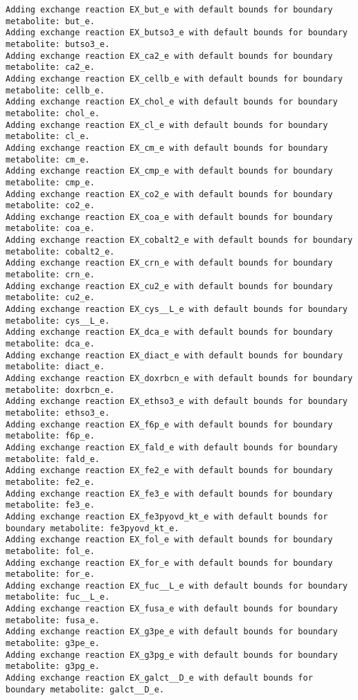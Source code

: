 \documentclass[
  letterpaper,
  DIV=11,
  numbers=noendperiod]{scrartcl}
\begin{document}
\begin{verbatim}
Adding exchange reaction EX_but_e with default bounds for boundary metabolite: but_e.
Adding exchange reaction EX_butso3_e with default bounds for boundary metabolite: butso3_e.
Adding exchange reaction EX_ca2_e with default bounds for boundary metabolite: ca2_e.
Adding exchange reaction EX_cellb_e with default bounds for boundary metabolite: cellb_e.
Adding exchange reaction EX_chol_e with default bounds for boundary metabolite: chol_e.
Adding exchange reaction EX_cl_e with default bounds for boundary metabolite: cl_e.
Adding exchange reaction EX_cm_e with default bounds for boundary metabolite: cm_e.
Adding exchange reaction EX_cmp_e with default bounds for boundary metabolite: cmp_e.
Adding exchange reaction EX_co2_e with default bounds for boundary metabolite: co2_e.
Adding exchange reaction EX_coa_e with default bounds for boundary metabolite: coa_e.
Adding exchange reaction EX_cobalt2_e with default bounds for boundary metabolite: cobalt2_e.
Adding exchange reaction EX_crn_e with default bounds for boundary metabolite: crn_e.
Adding exchange reaction EX_cu2_e with default bounds for boundary metabolite: cu2_e.
Adding exchange reaction EX_cys__L_e with default bounds for boundary metabolite: cys__L_e.
Adding exchange reaction EX_dca_e with default bounds for boundary metabolite: dca_e.
Adding exchange reaction EX_diact_e with default bounds for boundary metabolite: diact_e.
Adding exchange reaction EX_doxrbcn_e with default bounds for boundary metabolite: doxrbcn_e.
Adding exchange reaction EX_ethso3_e with default bounds for boundary metabolite: ethso3_e.
Adding exchange reaction EX_f6p_e with default bounds for boundary metabolite: f6p_e.
Adding exchange reaction EX_fald_e with default bounds for boundary metabolite: fald_e.
Adding exchange reaction EX_fe2_e with default bounds for boundary metabolite: fe2_e.
Adding exchange reaction EX_fe3_e with default bounds for boundary metabolite: fe3_e.
Adding exchange reaction EX_fe3pyovd_kt_e with default bounds for boundary metabolite: fe3pyovd_kt_e.
Adding exchange reaction EX_fol_e with default bounds for boundary metabolite: fol_e.
Adding exchange reaction EX_for_e with default bounds for boundary metabolite: for_e.
Adding exchange reaction EX_fuc__L_e with default bounds for boundary metabolite: fuc__L_e.
Adding exchange reaction EX_fusa_e with default bounds for boundary metabolite: fusa_e.
Adding exchange reaction EX_g3pe_e with default bounds for boundary metabolite: g3pe_e.
Adding exchange reaction EX_g3pg_e with default bounds for boundary metabolite: g3pg_e.
Adding exchange reaction EX_galct__D_e with default bounds for boundary metabolite: galct__D_e.

\end{verbatim}
\end{document}
